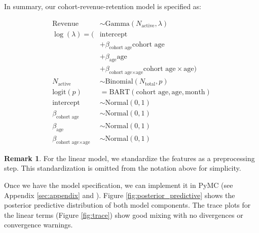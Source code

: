\documentclass[11pt]{amsart}
\theoremstyle{definition}
\newtheorem{remark}{Remark}
\begin{document}
In summary, our cohort-revenue-retention model is specified as:

\begin{align*}
    \text{Revenue}                              & \sim \text{Gamma}(N_{\text{active}}, \lambda)                                      \\
    \log(\lambda) = (                           & \text{intercept}                                                                   \\
                                                & + \beta_{\text{cohort age}} \text{cohort age}                                      \\
                                                & + \beta_{\text{age}} \text{age}                                                    \\
                                                & + \beta_{\text{cohort age} \times \text{age}} \text{cohort age} \times \text{age}) \\
    N_{\text{active}}                           & \sim \text{Binomial}(N_{\text{total}}, p)                                          \\
    \textrm{logit}(p)                           & = \text{BART}(\text{cohort age}, \text{age}, \text{month})                         \\
    \text{intercept}                            & \sim \text{Normal}(0, 1)                                                           \\
    \beta_{\text{cohort age}}                   & \sim \text{Normal}(0, 1)                                                           \\
    \beta_{\text{age}}                          & \sim \text{Normal}(0, 1)                                                           \\
    \beta_{\text{cohort age} \times \text{age}} & \sim \text{Normal}(0, 1)
\end{align*}

\begin{remark}
    For the linear model, we standardize the features as a preprocessing step. This standardization is omitted from the
    notation above for simplicity.
\end{remark}

Once we have the model specification, we can implement it in PyMC (see Appendix \ref{sec:appendix} and
\cite{orduz_revenue_retention}). Figure \ref{fig:posterior_predictive} shows the posterior predictive distribution of both
model components. The trace plots for the linear terms (Figure \ref{fig:trace}) show good mixing with no divergences or
convergence warnings.
\end{document}

